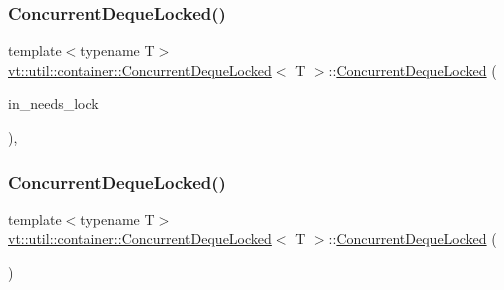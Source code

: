 \mbox{\label{structvt_1_1util_1_1container_1_1_concurrent_deque_locked_a8feaed4765d8775cd39c13df6499b5e8}} 
\subsubsection{\texorpdfstring{Concurrent\+Deque\+Locked()}{ConcurrentDequeLocked()}\hspace{0.1cm}{\footnotesize\ttfamily [2/3]}}
{\footnotesize\ttfamily template$<$typename T$>$ \\
\hyperlink{structvt_1_1util_1_1container_1_1_concurrent_deque_locked}{vt\+::util\+::container\+::\+Concurrent\+Deque\+Locked}$<$ T $>$\+::\hyperlink{structvt_1_1util_1_1container_1_1_concurrent_deque_locked}{Concurrent\+Deque\+Locked} (\begin{DoxyParamCaption}\item[{bool}]{in\+\_\+needs\+\_\+lock }\end{DoxyParamCaption})\hspace{0.3cm}{\ttfamily [inline]}, {\ttfamily [explicit]}}

\mbox{\label{structvt_1_1util_1_1container_1_1_concurrent_deque_locked_ab5d61f2f456b97092cc2164a070c2372}} 
\subsubsection{\texorpdfstring{Concurrent\+Deque\+Locked()}{ConcurrentDequeLocked()}\hspace{0.1cm}{\footnotesize\ttfamily [3/3]}}
{\footnotesize\ttfamily template$<$typename T$>$ \\
\hyperlink{structvt_1_1util_1_1container_1_1_concurrent_deque_locked}{vt\+::util\+::container\+::\+Concurrent\+Deque\+Locked}$<$ T $>$\+::\hyperlink{structvt_1_1util_1_1container_1_1_concurrent_deque_locked}{Concurrent\+Deque\+Locked} (\begin{DoxyParamCaption}\item[{\hyperlink{structvt_1_1util_1_1container_1_1_concurrent_deque_locked}{Concurrent\+Deque\+Locked}$<$ T $>$ const \&}]{ }\end{DoxyParamCaption})\hspace{0.3cm}{\ttfamily [delete]}}

